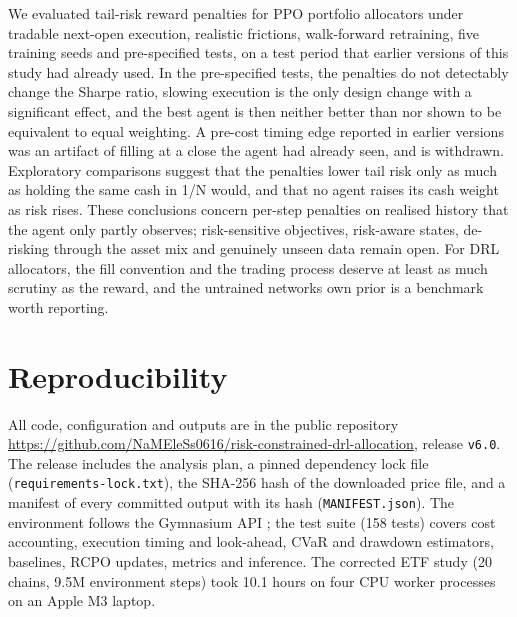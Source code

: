 \documentclass[11pt]{article}
\begin{document}
We evaluated tail-risk reward penalties for PPO portfolio allocators under tradable next-open execution, realistic frictions, walk-forward retraining, five training seeds and pre-specified tests, on a test period that earlier versions of this study had already used. In the pre-specified tests, the penalties do not detectably change the Sharpe ratio, slowing execution is the only design change with a significant effect, and the best agent is then neither better than nor shown to be equivalent to equal weighting. A pre-cost timing edge reported in earlier versions was an artifact of filling at a close the agent had already seen, and is withdrawn. Exploratory comparisons suggest that the penalties lower tail risk only as much as holding the same cash in 1/N would, and that no agent raises its cash weight as risk rises. These conclusions concern per-step penalties on realised history that the agent only partly observes; risk-sensitive objectives, risk-aware states, de-risking through the asset mix and genuinely unseen data remain open. For DRL allocators, the fill convention and the trading process deserve at least as much scrutiny as the reward, and the untrained network\textquotesingle s own prior is a benchmark worth reporting.

\section{Reproducibility}\label{s12}

All code, configuration and outputs are in the public repository \url{https://github.com/NaMEleSs0616/risk-constrained-drl-allocation}, release \texttt{v6.0}. The release includes the analysis plan, a pinned dependency lock file (\texttt{requirements-lock.txt}), the SHA-256 hash of the downloaded price file, and a manifest of every committed output with its hash (\texttt{MANIFEST.json}). The environment follows the Gymnasium API \cite{r42}; the test suite (158 tests) covers cost accounting, execution timing and look-ahead, CVaR and drawdown estimators, baselines, RCPO updates, metrics and inference. The corrected ETF study (20 chains, 9.5M environment steps) took 10.1 hours on four CPU worker processes on an Apple M3 laptop.
\end{document}
